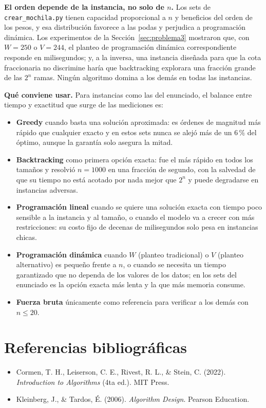 \documentclass[11pt,a4paper]{article}
\begin{document}
\textbf{El orden depende de la instancia, no solo de $n$.} Los sets de \texttt{crear\_mochila.py} tienen capacidad proporcional a $n$ y beneficios del orden de los pesos, y esa distribución favorece a las podas y perjudica a programación dinámica. Los experimentos de la Sección~\ref{sec:problema3} mostraron que, con $W = 250$ o $V = 244$, el planteo de programación dinámica correspondiente responde en milisegundos; y, a la inversa, una instancia diseñada para que la cota fraccionaria no discrimine haría que backtracking explorara una fracción grande de las $2^n$ ramas. Ningún algoritmo domina a los demás en todas las instancias.

\textbf{Qué conviene usar.} Para instancias como las del enunciado, el balance entre tiempo y exactitud que surge de las mediciones es:
\begin{itemize}
    \item \textbf{Greedy} cuando basta una solución aproximada: es órdenes de magnitud más rápido que cualquier exacto y en estos sets nunca se alejó más de un $6\,\%$ del óptimo, aunque la garantía solo asegura la mitad.
    \item \textbf{Backtracking} como primera opción exacta: fue el más rápido en todos los tamaños y resolvió $n = 1000$ en una fracción de segundo, con la salvedad de que su tiempo no está acotado por nada mejor que $2^n$ y puede degradarse en instancias adversas.
    \item \textbf{Programación lineal} cuando se quiere una solución exacta con tiempo poco sensible a la instancia y al tamaño, o cuando el modelo va a crecer con más restricciones: su costo fijo de decenas de milisegundos solo pesa en instancias chicas.
    \item \textbf{Programación dinámica} cuando $W$ (planteo tradicional) o $V$ (planteo alternativo) es pequeño frente a $n$, o cuando se necesita un tiempo garantizado que no dependa de los valores de los datos; en los sets del enunciado es la opción exacta más lenta y la que más memoria consume.
    \item \textbf{Fuerza bruta} únicamente como referencia para verificar a los demás con $n \le 20$.
\end{itemize}

\newpage

\section*{Referencias bibliográficas}

\begin{itemize}
    \item Cormen, T. H., Leiserson, C. E., Rivest, R. L., \& Stein, C. (2022). \textit{Introduction to Algorithms} (4ta ed.). MIT Press.
    \item Kleinberg, J., \& Tardos, É. (2006). \textit{Algorithm Design}. Pearson Education.
\end{itemize}
\end{document}
